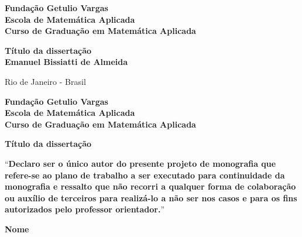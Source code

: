 \documentclass[12pt]{article}
\begin{document}
\begin{titlepage}
\begin{center}
\textbf{\LARGE Fundação Getulio Vargas}\\ 
\textbf{\LARGE Escola de Matemática Aplicada}\\
\textbf{\LARGE Curso de Graduação em Matemática Aplicada}

\par
\vspace{170pt}
\textbf{\Large Título da dissertação}\\
\vspace{80pt}
\textbf{\Large Emanuel Bissiatti de Almeida}\\
\end{center}

\par
\vfill
\begin{center}
{{\normalsize Rio de Janeiro - Brasil}\\
{\normalsize \the\year}}
\end{center}
\end{titlepage}

\thispagestyle{empty}

\newpage
\begin{center}
\textbf{\LARGE Fundação Getulio Vargas}\\ 
\textbf{\LARGE Escola de Matemática Aplicada}\\
\textbf{\LARGE Curso de Graduação em Matemática Aplicada}

\par
\vspace{100pt}
\textbf{\Large Título da dissertação}


\par
\vspace{65pt}
``\textbf{Declaro ser o único autor do presente projeto de
monografia que refere-se ao plano de trabalho a ser executado para continuidade da monografia e ressalto que não recorri a qualquer forma de colaboração ou auxílio de terceiros para realizá-lo a não ser nos casos e para os fins autorizados pelo professor orientador.}''
\end{center}

\par
\vspace{65pt}
\begin{center}


\hrulefill

\vspace{5pt}
\textbf{\Large Nome}
\end{center}
\end{document}
